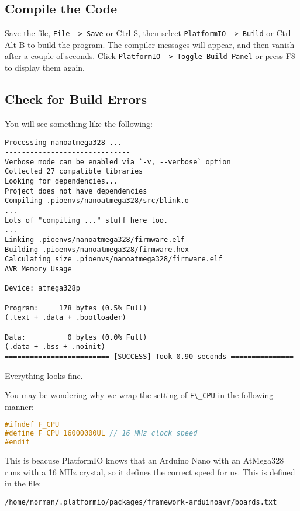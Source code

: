 \subsection{Compile the Code}\label{compile-the-code}

Save the file, \lstinline!File -> Save! or Ctrl-S, then select
\lstinline!PlatformIO -> Build! or Ctrl-Alt-B to build the program. The
compiler messages will appear, and then vanish after a couple of
seconds. Click \lstinline!PlatformIO -> Toggle Build Panel! or press F8
to display them again.

\subsection{Check for Build Errors}\label{check-for-build-errors}

You will see something like the following:

\begin{lstlisting}
Processing nanoatmega328 ...
------------------------------
Verbose mode can be enabled via `-v, --verbose` option
Collected 27 compatible libraries
Looking for dependencies...
Project does not have dependencies
Compiling .pioenvs/nanoatmega328/src/blink.o
...
Lots of "compiling ..." stuff here too.
...
Linking .pioenvs/nanoatmega328/firmware.elf
Building .pioenvs/nanoatmega328/firmware.hex
Calculating size .pioenvs/nanoatmega328/firmware.elf
AVR Memory Usage
----------------
Device: atmega328p
 
Program:     178 bytes (0.5% Full)
(.text + .data + .bootloader)
 
Data:          0 bytes (0.0% Full)
(.data + .bss + .noinit)
========================= [SUCCESS] Took 0.90 seconds ===============
\end{lstlisting}

Everything looks fine.

You may be wondering why we wrap the setting of \lstinline!F\_CPU! in the following manner:

\begin{lstlisting}[language=C,firstnumber=6,caption={Fixing F\_CPU warning in AVRBlick.c}]
#ifndef F_CPU
#define F_CPU 16000000UL // 16 MHz clock speed
#endif
\end{lstlisting}

This is beacuse PlatformIO knows that an Arduino Nano with an AtMega328 runs with a 16
MHz crystal, so it defines the correct speed for us. This is defined in the file:

\lstinline!/home/norman/.platformio/packages/framework-arduinoavr/boards.txt!

